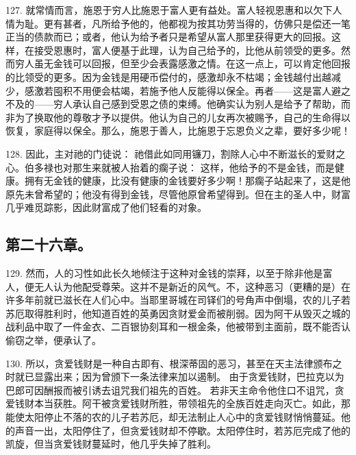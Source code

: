 127. 就常情而言，施恩于穷人比施恩于富人更有益处。富人轻视恩惠和以欠下人情为耻。更有甚者，凡所给予他的，他都视为按其功劳当得的，仿佛只是偿还一笔正当的债款而已；或者，他认为给予者只是希望从富人那里获得更大的回报。这样，在接受恩惠时，富人便基于此理，认为自己给予的，比他从前领受的更多。然而穷人虽无金钱可以回报，但至少会表露感激之情。在这一点上，可以肯定他回报的比领受的更多。因为金钱是用硬币偿付的，感激却永不枯竭；金钱越付出越减少，感激若囤积不用便会枯竭，若施予他人反能得以保全。再者——这是富人避之不及的——穷人承认自己感到受恩之债的束缚。他确实认为别人是给予了帮助，而非为了换取他的尊敬才予以提供。他认为自己的儿女再次被赐予，自己的生命得以恢复，家庭得以保全。那么，施恩于善人，比施恩于忘恩负义之辈，要好多少呢！\par

128. 因此，主对祂的门徒说： 祂借此如同用镰刀，割除人心中不断滋长的爱财之心。伯多禄也对那生来就被人抬着的瘸子说： 这样，他给予的不是金钱，而是健康。拥有无金钱的健康，比没有健康的金钱要好多少啊！那瘸子站起来了，这是他原先未曾希望的；他没有得到金钱，尽管他原曾希望得到。但在主的圣人中，财富几乎难觅踪影，因此财富成了他们轻看的对象。\par


\subsection{第二十六章。}

\par

129. 然而，人的习性如此长久地倾注于这种对金钱的崇拜，以至于除非他是富人，便无人认为他配受尊荣。这并不是新近的风气。不，这种恶习（更糟的是）在许多年前就已滋长在人们心中。当耶里哥城在司铎们的号角声中倒塌，农的儿子若苏厄取得胜利时，他知道百姓的英勇因贪财爱金而被削弱。因为阿干从毁灭之城的战利品中取了一件金衣、二百银协刻耳和一根金条，他被带到主面前，既不能否认偷窃之举，便承认了。\par

130. 所以，贪爱钱财是一种自古即有、根深蒂固的恶习，甚至在天主法律颁布之时就已显露出来；因为曾颁下一条法律来加以遏制。 由于贪爱钱财，巴拉克以为巴郎可因酬报而被引诱去诅咒我们祖先的百姓。 若非天主命令他住口不诅咒，贪爱钱财本当获胜。阿干被贪爱钱财所胜，带领祖先的全族百姓走向灭亡。如此，那能使太阳停止不落的农的儿子若苏厄，却无法制止人心中的贪爱钱财悄悄蔓延。他的声音一出，太阳停住了，但贪爱钱财却不停歇。太阳停住时，若苏厄完成了他的凯旋，但当贪爱钱财蔓延时，他几乎失掉了胜利。\par

